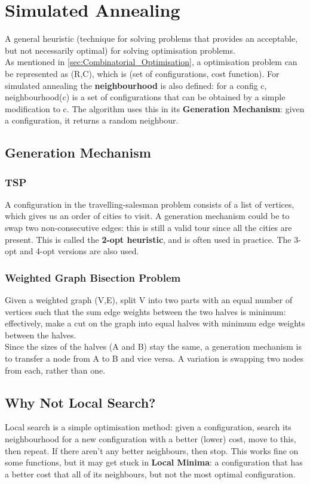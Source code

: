 \section{Simulated Annealing}
A general heuristic (technique for solving problems that provides an acceptable, but not necessarily optimal) for solving optimisation problems. \\
As mentioned in \ref{sec:Combinatorial_Optimisation}, a optimisation problem can be represented as (R,C), which is (set of configurations, cost function). For simulated annealing the \textbf{neighbourhood} is also defined: for a config c, neighbourhood(c) is a set of configurations that can be obtained by a simple modification to c. The algorithm uses this in its \textbf{Generation Mechanism}: given a configuration, it returns a random neighbour.

\subsection{Generation Mechanism}

\subsubsection{TSP}
A configuration in the travelling-salesman problem consists of a list of vertices, which gives us an order of cities to visit. A generation mechanism could be to swap two non-consecutive edges: this is still a valid tour since all the cities are present. This is called the \textbf{2-opt heuristic}, and is often used in practice. The 3-opt and 4-opt versions are also used.

\subsubsection{Weighted Graph Bisection Problem}
Given a weighted graph (V,E), split V into two parts with an equal number of vertices such that the sum edge weights between the two halves is minimum: effectively, make a cut on the graph into equal halves with minimum edge weights between the halves. \\
Since the sizes of the halves (A and B) stay the same, a generation mechanism is to transfer a node from A to B and vice versa. A variation is swapping two nodes from each, rather than one.

\subsection{Why Not Local Search?}
Local search is a simple optimisation method: given a configuration, search its neighbourhood for a new configuration with a better (lower) cost, move to this, then repeat. If there aren't any better neighbours, then stop. This works fine on some functions, but it may get stuck in \textbf{Local Minima}: a configuration that has a better cost that all of its neighbours, but not the most optimal configuration.

